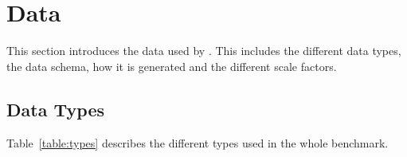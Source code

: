 
\section{Data}\label{section:data}

\newcommand{\attributecolumn}{2.5cm}
\newcommand{\typecolumn}{2.7cm}
\newcommand{\descriptioncolumn}{10.3cm}
\newcommand{\largedescriptioncolumn}{13cm}


This section introduces the data used by \ldbcsnb. This includes the different
data types, the data schema, how it is generated and the different scale
factors.

\subsection{Data Types}
Table~\ref{table:types} describes the different types used in the whole benchmark.

